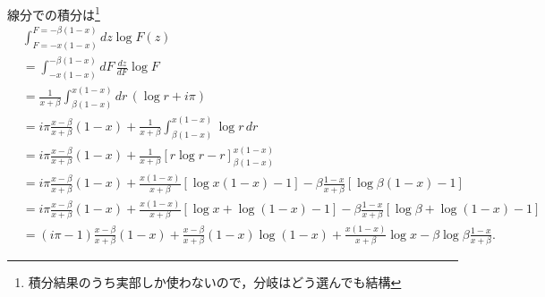 線分での積分は\footnote{積分結果のうち実部しか使わないので，分岐はどう選んでも結構}
\begin{align*}
  & \int_{F=-x(1-x)}^{F=-\beta(1-x)} dz \log F(z) \\
  &= \int_{-x(1-x)}^{-\beta(1-x)} dF \, \frac{dz}{dF} \log F \\
  &= \frac{1}{x+\beta} \int_{\beta(1-x)}^{x(1-x)} dr \, (\log r + i\pi) \\
  &= i\pi \frac{x-\beta}{x+\beta}(1-x) + \frac{1}{x+\beta} \int_{\beta(1-x)}^{x(1-x)} \log r \, dr \\
  &= i\pi \frac{x-\beta}{x+\beta}(1-x) + \frac{1}{x+\beta} \left[ r \log r - r \right]_{\beta(1-x)}^{x(1-x)} \\
  &= i\pi \frac{x-\beta}{x+\beta}(1-x) + \frac{x(1-x)}{x+\beta} \left[ \log x(1-x) - 1 \right] - \beta \frac{1-x}{x+\beta} \left[ \log \beta(1-x) - 1 \right] \\
  &= i\pi \frac{x-\beta}{x+\beta}(1-x) + \frac{x(1-x)}{x+\beta} \left[ \log x + \log (1-x) - 1 \right] - \beta \frac{1-x}{x+\beta} \left[ \log \beta + \log(1-x) - 1 \right] \\
  &= (i\pi - 1) \frac{x-\beta}{x+\beta}(1-x) + \frac{x-\beta}{x+\beta}(1-x) \log (1-x)
  + \frac{x(1-x)}{x+\beta} \log x - \beta \log \beta \frac{1-x}{x+\beta} .
\end{align*}

